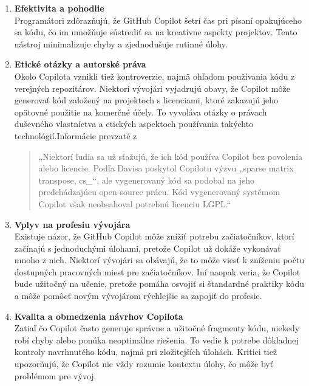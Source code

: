 \documentclass[10pt,oneside,slovak,a4paper, onecolumn]{article}
\begin{document}
\begin{enumerate}
    \item \textbf{Efektivita a pohodlie} \\
    Programátori zdôrazňujú, že GitHub Copilot šetrí čas pri písaní opakujúceho sa kódu, čo im umožňuje sústrediť sa na kreatívne aspekty projektov. Tento nástroj minimalizuje chyby a zjednodušuje rutinné úlohy.
    
    \item \textbf{Etické otázky a autorské práva} \\
    Okolo Copilota vznikli tiež kontroverzie, najmä ohľadom používania kódu z verejných repozitárov. Niektorí vývojári vyjadrujú obavy, že Copilot môže generovať kód založený na projektoch s licenciami, ktoré zakazujú jeho opätovné použitie na komerčné účely. To vyvoláva otázky o právach duševného vlastníctva a etických aspektoch používania takýchto technológií.Informácie prevzaté z \cite{Medium}
    \begin{quote}
„Niektorí ľudia sa už sťažujú, že ich kód používa Copilot bez povolenia alebo licencie. Podľa Davisa poskytol Copilotu výzvu „sparse matrix transpose, cs\_“, ale vygenerovaný kód sa podobal na jeho predchádzajúcu open-source prácu. Kód vygenerovaný systémom Copilot však neobsahoval potrebnú licenciu LGPL.“ 
\end{quote}
    
    \item \textbf{Vplyv na profesiu vývojára} \\
    Existuje názor, že GitHub Copilot môže znížiť potrebu začiatočníkov, ktorí začínajú s jednoduchými úlohami, pretože Copilot už dokáže vykonávať mnoho z nich. Niektorí vývojári sa obávajú, že to môže viesť k zníženiu počtu dostupných pracovných miest pre začiatočníkov. Iní naopak veria, že Copilot bude užitočný na učenie, pretože pomáha osvojiť si štandardné praktiky kódu a môže pomôcť novým vývojárom rýchlejšie sa zapojiť do profesie.
    
    \item \textbf{Kvalita a obmedzenia návrhov Copilota} \\
    Zatiaľ čo Copilot často generuje správne a užitočné fragmenty kódu, niekedy robí chyby alebo ponúka neoptimálne riešenia. To vedie k potrebe dôkladnej kontroly navrhnutého kódu, najmä pri zložitejších úlohách. Kritici tiež upozorňujú, že Copilot nie vždy rozumie kontextu úlohy, čo môže byť problémom pre vývoj.
\end{enumerate}
\end{document}
